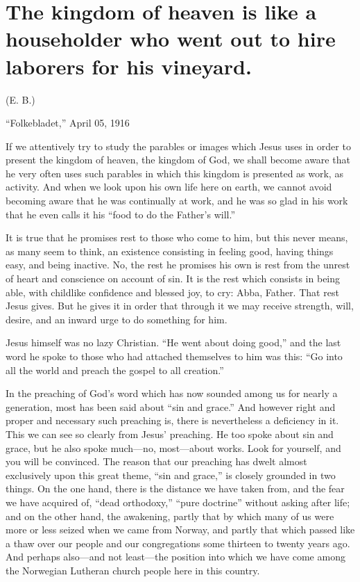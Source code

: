 


\section{The kingdom of heaven is like a householder who went out to hire laborers for his vineyard.}
(E. B.)

“Folkebladet,” April 05, 1916

If we attentively try to study the parables or images which Jesus uses in order to present the kingdom of heaven, the kingdom of God, we shall become aware that he very often uses such parables in which this kingdom is presented as work, as activity. And when we look upon his own life here on earth, we cannot avoid becoming aware that he was continually at work, and he was so glad in his work that he even calls it his “food to do the Father’s will.”

It is true that he promises rest to those who come to him, but this never means, as many seem to think, an existence consisting in feeling good, having things easy, and being inactive. No, the rest he promises his own is rest from the unrest of heart and conscience on account of sin. It is the rest which consists in being able, with childlike confidence and blessed joy, to cry: Abba, Father. That rest Jesus gives. But he gives it in order that through it we may receive strength, will, desire, and an inward urge to do something for him.

Jesus himself was no lazy Christian. “He went about doing good,” and the last word he spoke to those who had attached themselves to him was this: “Go into all the world and preach the gospel to all creation.”

In the preaching of God’s word which has now sounded among us for nearly a generation, most has been said about “sin and grace.” And however right and proper and necessary such preaching is, there is nevertheless a deficiency in it. This we can see so clearly from Jesus’ preaching. He too spoke about sin and grace, but he also spoke much—no, most—about works. Look for yourself, and you will be convinced. The reason that our preaching has dwelt almost exclusively upon this great theme, “sin and grace,” is closely grounded in two things. On the one hand, there is the distance we have taken from, and the fear we have acquired of, “dead orthodoxy,” “pure doctrine” without asking after life; and on the other hand, the awakening, partly that by which many of us were more or less seized when we came from Norway, and partly that which passed like a thaw over our people and our congregations some thirteen to twenty years ago. And perhaps also—and not least—the position into which we have come among the Norwegian Lutheran church people here in this country.

